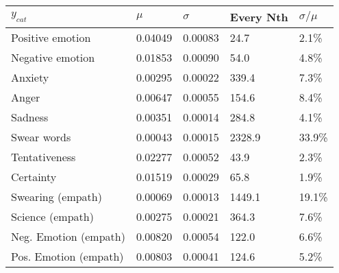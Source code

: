\begin{tabular}{lllll}
\toprule
$y_{cat}$ &    $\mu$ & $\sigma$ & Every Nth & $\sigma / \mu$ \\
\midrule
Positive emotion      &  0.04049 &  0.00083 &      24.7 &          2.1\% \\
Negative emotion      &  0.01853 &  0.00090 &      54.0 &          4.8\% \\
Anxiety               &  0.00295 &  0.00022 &     339.4 &          7.3\% \\
Anger                 &  0.00647 &  0.00055 &     154.6 &          8.4\% \\
Sadness               &  0.00351 &  0.00014 &     284.8 &          4.1\% \\
Swear words           &  0.00043 &  0.00015 &    2328.9 &         33.9\% \\
Tentativeness         &  0.02277 &  0.00052 &      43.9 &          2.3\% \\
Certainty             &  0.01519 &  0.00029 &      65.8 &          1.9\% \\
Swearing (empath)     &  0.00069 &  0.00013 &    1449.1 &         19.1\% \\
Science (empath)      &  0.00275 &  0.00021 &     364.3 &          7.6\% \\
Neg. Emotion (empath) &  0.00820 &  0.00054 &     122.0 &          6.6\% \\
Pos. Emotion (empath) &  0.00803 &  0.00041 &     124.6 &          5.2\% \\
\bottomrule
\end{tabular}
